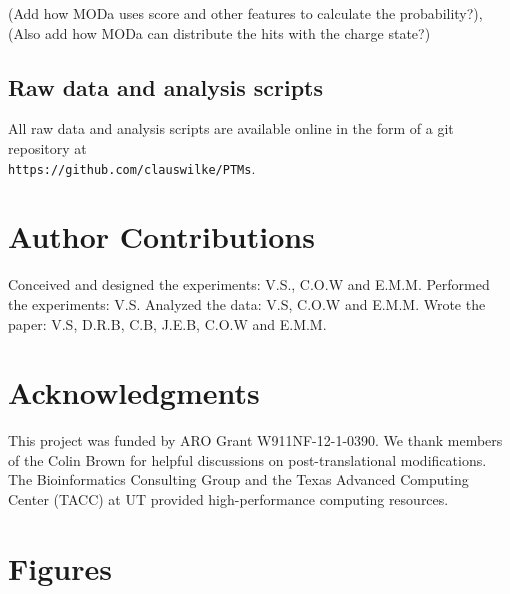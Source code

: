 \documentclass[12pt]{article}
\begin{document}
(Add how MODa uses score and other features to calculate the probability?), (Also add how MODa can distribute the hits with the charge state?)

\subsection{Raw data and analysis scripts}

All raw data and analysis scripts are available online in the form of a git repository at\\ \texttt{https://github.com/clauswilke/PTMs}.


\section{Author Contributions}
Conceived and designed the experiments: V.S., C.O.W and E.M.M. Performed the experiments: V.S. Analyzed the data: V.S, C.O.W and E.M.M. Wrote the paper: V.S, D.R.B, C.B, J.E.B, C.O.W and E.M.M.

\section{Acknowledgments}
This project was funded by ARO Grant W911NF-12-1-0390. We thank members of the Colin Brown for helpful discussions on post-translational modifications. The Bioinformatics Consulting Group and the Texas Advanced Computing Center (TACC) at UT provided high-performance computing resources. 




\newpage

\section*{Figures}
\end{document}
